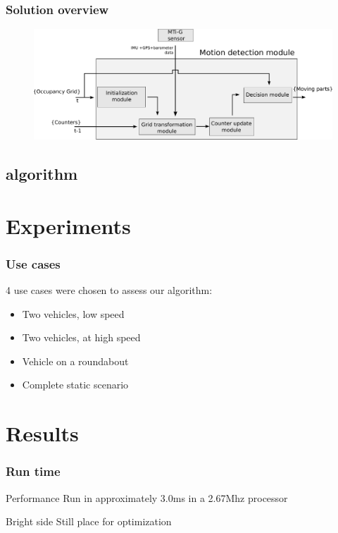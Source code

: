 \documentclass{beamer}
\begin{document}
	\begin{frame}
		\frametitle{Solution overview}
		\begin{figure}[h]
			\center
			\includegraphics[scale=0.27]{../img/fig:motion:framework:motionmodule}
		 \end{figure}
		
	\end{frame}		
	

\subsection{algorithm}


\section{Experiments}

	\begin{frame}
		\frametitle{Use cases}
		4 use cases were chosen to assess our algorithm:
		\begin{itemize}
		\item Two vehicles, low speed
		\item Two vehicles, at high speed
		\item Vehicle on a roundabout
		\item Complete static scenario
		\end{itemize}						
	\end{frame}

\section{Results}

	\begin{frame}
		\frametitle{Run time}

		\begin{alertblock}{Performance}
			Run in approximately 3.0ms in a 2.67Mhz processor
		\end{alertblock}		
		
		\begin{exampleblock}{Bright side}
			Still place for optimization
		\end{exampleblock}				
		
	\end{frame}	
\end{document}
